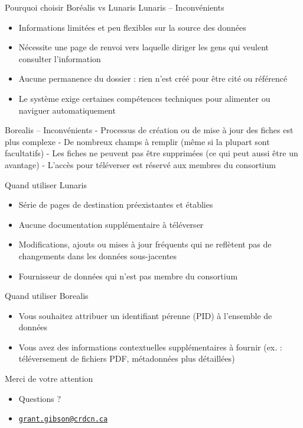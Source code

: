 \documentclass[
  ignorenonframetext,
]{beamer}
\providecommand{\tightlist}{%
  \setlength{\itemsep}{0pt}\setlength{\parskip}{0pt}}
\begin{document}
\begin{frame}{Pourquoi choisir Boréalis vs Lunaris}
\label{pourquoi-choisir-boruxe9alis-vs-lunaris-1}
Lunaris -- Inconvénients

\begin{itemize}
\tightlist
\item
  Informations limitées et peu flexibles sur la source des données
\item
  Nécessite une page de renvoi vers laquelle diriger les gens qui
  veulent consulter l'information
\item
  Aucune permanence du dossier : rien n'est créé pour être cité ou
  référencé
\item
  Le système exige certaines compétences techniques pour alimenter ou
  naviguer automatiquement
\end{itemize}

Borealis -- Inconvénients - Processus de création ou de mise à jour des
fiches est plus complexe - De nombreux champs à remplir (même si la
plupart sont facultatifs) - Les fiches ne peuvent pas être supprimées
(ce qui peut aussi être un avantage) - L'accès pour téléverser est
réservé aux membres du consortium
\end{frame}

\begin{frame}{Quand utiliser Lunaris}
\label{quand-utiliser-lunaris}
\begin{itemize}
\tightlist
\item
  Série de pages de destination préexistantes et établies
\item
  Aucune documentation supplémentaire à téléverser
\item
  Modifications, ajouts ou mises à jour fréquents qui ne reflètent pas
  de changements dans les données sous-jacentes
\item
  Fournisseur de données qui n'est pas membre du consortium
\end{itemize}
\end{frame}

\begin{frame}{Quand utiliser Borealis}
\label{quand-utiliser-borealis}
\begin{itemize}
\tightlist
\item
  Vous souhaitez attribuer un identifiant pérenne (PID) à l'ensemble de
  données
\item
  Vous avez des informations contextuelles supplémentaires à fournir
  (ex. : téléversement de fichiers PDF, métadonnées plus détaillées)
\end{itemize}
\end{frame}

\begin{frame}{Merci de votre attention}
\label{merci-de-votre-attention}
\begin{itemize}
\item
  Questions ?
\item
  \href{mailto:grant.gibson@crdcn.ca}{\nolinkurl{grant.gibson@crdcn.ca}}
\end{itemize}
\end{frame}
\end{document}
